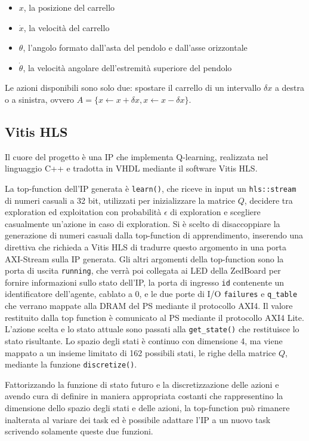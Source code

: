 \documentclass{article}
\begin{document}
\begin{itemize}
\item $x$, la posizione del carrello
\item $\dot{x}$, la velocità del carrello
\item $\theta$, l'angolo formato dall'asta del pendolo e dall'asse orizzontale
\item $\dot{\theta}$, la velocità angolare dell'estremità superiore del pendolo
\end{itemize}

Le azioni disponibili sono solo due: spostare il carrello di un intervallo $\delta x$ a destra o a sinistra, ovvero $A = \{x \leftarrow x + \delta x, x \leftarrow x - \delta x\}$. 

\subsection{Vitis HLS}
Il cuore del progetto è una IP che implementa Q-learning, realizzata nel linguaggio C++ e tradotta in VHDL mediante il software Vitis HLS. 

La top-function dell'IP generata è \texttt{learn()}, che riceve in input un \texttt{hls::stream} di numeri casuali a 32 bit, utilizzati per inizializzare la matrice $Q$, decidere tra exploration ed exploitation con probabilità $\epsilon$ di exploration e scegliere casualmente un'azione in caso di exploration. 
Si è scelto di disaccoppiare la generazione di numeri casuali dalla top-function di apprendimento, inserendo una direttiva che richieda a Vitis HLS di tradurre questo argomento in una porta AXI-Stream sulla IP generata. 
Gli altri argomenti della top-function sono la porta di uscita \texttt{running}, che verrà poi collegata ai LED della ZedBoard per fornire informazioni sullo stato dell'IP, la porta di ingresso \texttt{id} contenente un identificatore dell'agente, cablato a 0, e le due porte di I/O \texttt{failures} e \texttt{q\_table} che verrano mappate alla DRAM del PS mediante il protocollo AXI4. 
Il valore restituito dalla top function è comunicato al PS mediante il protocollo AXI4 Lite. 
L'azione scelta e lo stato attuale sono passati alla \texttt{get\_state()} che restituisce lo stato risultante. 
Lo spazio degli stati è continuo con dimensione 4, ma viene mappato a un insieme limitato di 162 possibili stati, le righe della matrice $Q$, mediante la funzione \texttt{discretize()}. 

Fattorizzando la funzione di stato futuro e la discretizzazione delle azioni e avendo cura di definire in maniera appropriata costanti che rappresentino la dimensione dello spazio degli stati e delle azioni, la top-function può rimanere inalterata al variare dei task ed è possibile adattare l'IP a un nuovo task scrivendo solamente queste due funzioni. 
\end{document}
